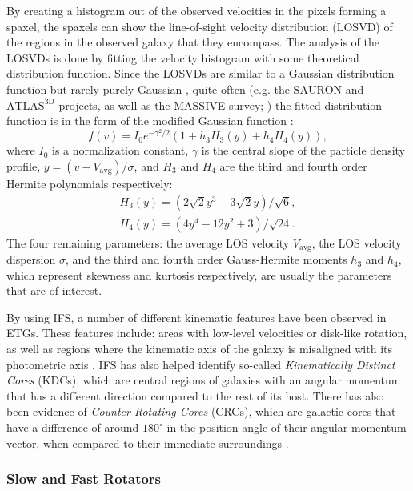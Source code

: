 \documentclass[english, oneside]{HYgradu}
\begin{document}
By creating a histogram out of the observed velocities in the pixels forming a spaxel, the spaxels can show the line-of-sight velocity distribution (LOSVD) of the regions in the observed galaxy that they encompass. The analysis of the LOSVDs is done by fitting the velocity histogram with some theoretical distribution function. Since the LOSVDs are similar to a Gaussian distribution function but rarely purely Gaussian \citep{GalaxyFormationAndEvo2010}, quite often  (e.g. the $\mathrm{SAURON}$ and $\mathrm{ATLAS^{3D}}$ projects, as well as the MASSIVE survey; \citealt{Bacon2001, Cappellari2011, Ma2014MASSIVE}) the fitted distribution function is in the form of the modified Gaussian function \citep{VanDerMarel1993, Bender1994}:
\begin{equation}
f(v) = I_0 e^{-\gamma^2/2}(1 + h_3 H_3(y) + h_4 H_4(y)), \label{eq:mod_gaussian}
\end{equation} 
where $I_0$ is a normalization constant, $\gamma$ is the central slope of the particle density profile, $y = (v - V_\mathrm{avg})/\sigma$, and $H_3$ and $H_4$ are the third and fourth order Hermite polynomials respectively:
\begin{eqnarray}
H_3(y) = \left(2\sqrt{2}y^3 - 3\sqrt{2}y\right) / \sqrt{6}, \\
H_4(y) = \left(4y^4 - 12y^2 + 3 \right) / \sqrt{24}.
\end{eqnarray}
The four remaining parameters: the average LOS velocity $V_\mathrm{avg}$, the LOS velocity dispersion $\sigma$, and the third and fourth order Gauss-Hermite moments $h_3$ and $h_4$, which represent skewness and kurtosis respectively, are usually the parameters that are of interest.

By using IFS, a number of different kinematic features have been observed in ETGs. These features include: areas with low-level velocities or disk-like rotation, as well as regions where the kinematic axis of the galaxy is misaligned with its photometric axis \citep{Emsellem2007}. IFS has also helped identify so-called \textit{Kinematically Distinct Cores} (KDCs), which are central regions of galaxies with an angular momentum that has a different direction compared to the rest of its host. There has also been evidence of \textit{Counter Rotating Cores} (CRCs), which are galactic cores that have a difference of around $180^\circ$ in the position angle of their angular momentum vector, when compared to their immediate surroundings \citep{Krajnovic2011}.

\subsubsection{Slow and Fast Rotators}
\end{document}
